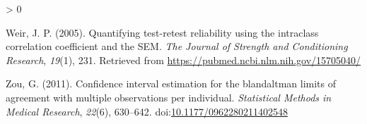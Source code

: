 \documentclass[
]{article}
\newlength{\cslhangindent}
\newenvironment{CSLReferences}[2] %
 {%
  \setlength{\parindent}{0pt}
  \ifodd #1 \everypar{\setlength{\hangindent}{\cslhangindent}}\ignorespaces\fi
  \ifnum #2 > 0
  \setlength{\parskip}{#2\baselineskip}
  \fi
 }%
 {}
\begin{document}
\begin{CSLReferences}{1}{0}
\leavevmode\hypertarget{ref-weir2005}{}%
Weir, J. P. (2005). Quantifying test-retest reliability using the
intraclass correlation coefficient and the {SEM}. \emph{The Journal of
Strength and Conditioning Research}, \emph{19}(1), 231. Retrieved from
\url{https://pubmed.ncbi.nlm.nih.gov/15705040/}

\leavevmode\hypertarget{ref-zou2011}{}%
Zou, G. (2011). Confidence interval estimation for the bland{{}}altman
limits of agreement with multiple observations per individual.
\emph{Statistical Methods in Medical Research}, \emph{22}(6), 630--642.
doi:\href{https://doi.org/10.1177/0962280211402548}{10.1177/0962280211402548}

\end{CSLReferences}
\end{document}
